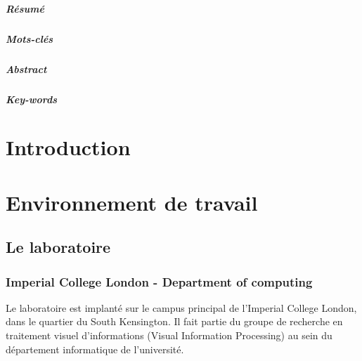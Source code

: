\documentclass[10pt]{report}
\begin{document}
\paragraph*{Résumé} %
\paragraph*{Mots-clés}
\paragraph*{Abstract}
\paragraph*{Key-words}
\renewcommand\contentsname{Sommaire}
\tableofcontents

\newpage
\chapter*{Introduction}
\chapter{Environnement de travail} 
	\section{Le laboratoire}
	\subsection{Imperial College London - Department of computing}
	Le laboratoire est implanté sur le campus principal de l'Imperial College London, dans le quartier du South Kensington. Il fait partie du groupe de recherche en traitement visuel d'informations (Visual Information Processing) au sein du département informatique de l'université.
	
	
\end{document}
